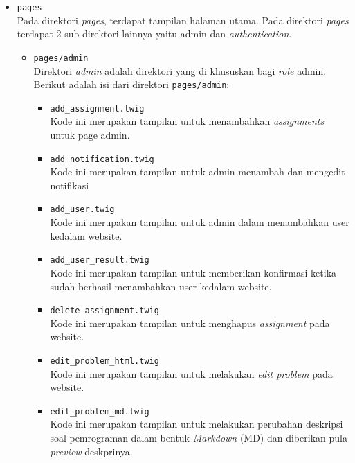 \begin{itemize}

	\item \verb|pages| \\
	      Pada direktori \textit{pages}, terdapat tampilan halaman utama. Pada direktori \textit{pages} terdapat 2 sub direktori lainnya yaitu admin dan \textit{authentication}.

	      \begin{itemize}
		      \item \verb|pages/admin| \\
		            Direktori \textit{admin} adalah direktori yang di khususkan bagi \textit{role} admin. Berikut adalah isi dari direktori \verb|pages/admin|:

		            \begin{itemize}
			            \item \verb|add_assignment.twig| \\
                        Kode ini merupakan tampilan untuk menambahkan \textit{assignments} untuk page admin.
			            \item \verb|add_notification.twig| \\
                        Kode ini merupakan tampilan untuk admin menambah dan mengedit notifikasi
			            \item \verb|add_user.twig|\\
                        Kode ini merupakan tampilan untuk admin dalam menambahkan user kedalam website.
			            \item \verb|add_user_result.twig|\\
                        Kode ini merupakan tampilan untuk memberikan konfirmasi ketika sudah berhasil menambahkan user kedalam website.
			            \item \verb|delete_assignment.twig|\\
                        Kode ini merupakan tampilan untuk menghapus \textit{assignment} pada website.
			            \item \verb|edit_problem_html.twig|\\
                        Kode ini merupakan tampilan untuk melakukan \textit{edit problem} pada website.
			            \item \verb|edit_problem_md.twig|\\
                        Kode ini merupakan tampilan untuk melakukan perubahan deskripsi soal pemrograman dalam bentuk \textit{Markdown} (MD) dan diberikan pula \textit{preview} deskprinya.

\end{itemize}
\end{itemize}
\end{itemize}
